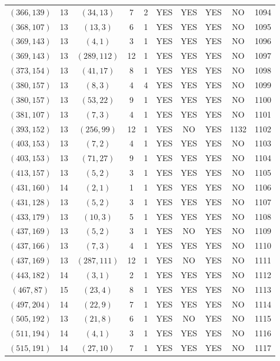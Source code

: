 \begin{longtable}{|c|c|c|c|c|c|c|c|c|c|}
$(366, 139)$ & 13 & $(34, 13)$ & 7 & 2 & YES & YES & YES & NO & 1094\\
$(368, 107)$ & 13 & $(13, 3)$ & 6 & 1 & YES & YES & YES & NO & 1095\\
$(369, 143)$ & 13 & $(4, 1)$ & 3 & 1 & YES & YES & YES & NO & 1096\\
$(369, 143)$ & 13 & $(289, 112)$ & 12 & 1 & YES & YES & YES & NO & 1097\\
$(373, 154)$ & 13 & $(41, 17)$ & 8 & 1 & YES & YES & YES & NO & 1098\\
$(380, 157)$ & 13 & $(8, 3)$ & 4 & 4 & YES & YES & YES & NO & 1099\\
$(380, 157)$ & 13 & $(53, 22)$ & 9 & 1 & YES & YES & YES & NO & 1100\\
$(381, 107)$ & 13 & $(7, 3)$ & 4 & 1 & YES & YES & YES & NO & 1101\\
$(393, 152)$ & 13 & $(256, 99)$ & 12 & 1 & YES & NO & YES & 1132 & 1102\\
$(403, 153)$ & 13 & $(7, 2)$ & 4 & 1 & YES & YES & YES & NO & 1103\\
$(403, 153)$ & 13 & $(71, 27)$ & 9 & 1 & YES & YES & YES & NO & 1104\\
$(413, 157)$ & 13 & $(5, 2)$ & 3 & 1 & YES & YES & YES & NO & 1105\\
$(431, 160)$ & 14 & $(2, 1)$ & 1 & 1 & YES & YES & YES & NO & 1106\\
$(431, 128)$ & 13 & $(5, 2)$ & 3 & 1 & YES & YES & YES & NO & 1107\\
$(433, 179)$ & 13 & $(10, 3)$ & 5 & 1 & YES & YES & YES & NO & 1108\\
$(437, 169)$ & 13 & $(5, 2)$ & 3 & 1 & YES & NO & YES & NO & 1109\\
$(437, 166)$ & 13 & $(7, 3)$ & 4 & 1 & YES & YES & YES & NO & 1110\\
$(437, 169)$ & 13 & $(287, 111)$ & 12 & 1 & YES & NO & YES & NO & 1111\\
$(443, 182)$ & 14 & $(3, 1)$ & 2 & 1 & YES & YES & YES & NO & 1112\\
$(467, 87)$ & 15 & $(23, 4)$ & 8 & 1 & YES & YES & YES & NO & 1113\\
$(497, 204)$ & 14 & $(22, 9)$ & 7 & 1 & YES & YES & YES & NO & 1114\\
$(505, 192)$ & 13 & $(21, 8)$ & 6 & 1 & YES & NO & YES & NO & 1115\\
$(511, 194)$ & 14 & $(4, 1)$ & 3 & 1 & YES & YES & YES & NO & 1116\\
$(515, 191)$ & 14 & $(27, 10)$ & 7 & 1 & YES & YES & YES & NO & 1117\\

\end{longtable}
